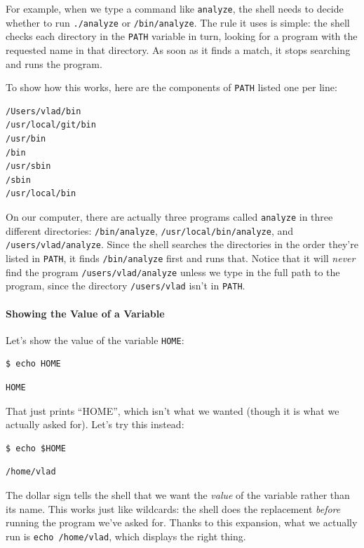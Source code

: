 \documentclass{book}
\begin{document}
For example, when we type a command like \texttt{analyze}, the shell
needs to decide whether to run \texttt{./analyze} or
\texttt{/bin/analyze}. The rule it uses is simple: the shell checks each
directory in the \texttt{PATH} variable in turn, looking for a program
with the requested name in that directory. As soon as it finds a match,
it stops searching and runs the program.

To show how this works, here are the components of \texttt{PATH} listed
one per line:

\begin{verbatim}
/Users/vlad/bin
/usr/local/git/bin
/usr/bin
/bin
/usr/sbin
/sbin
/usr/local/bin
\end{verbatim}

On our computer, there are actually three programs called
\texttt{analyze} in three different directories: \texttt{/bin/analyze},
\texttt{/usr/local/bin/analyze}, and \texttt{/users/vlad/analyze}. Since
the shell searches the directories in the order they're listed in
\texttt{PATH}, it finds \texttt{/bin/analyze} first and runs that.
Notice that it will \emph{never} find the program
\texttt{/users/vlad/analyze} unless we type in the full path to the
program, since the directory \texttt{/users/vlad} isn't in
\texttt{PATH}.

\mbox{}\paragraph{Showing the Value of a Variable}

Let's show the value of the variable \texttt{HOME}:

\begin{verbatim}
$ echo HOME
\end{verbatim}

\begin{verbatim}
HOME
\end{verbatim}

That just prints ``HOME'', which isn't what we wanted (though it is what
we actually asked for). Let's try this instead:

\begin{verbatim}
$ echo $HOME
\end{verbatim}

\begin{verbatim}
/home/vlad
\end{verbatim}

The dollar sign tells the shell that we want the \emph{value} of the
variable rather than its name. This works just like wildcards: the shell
does the replacement \emph{before} running the program we've asked for.
Thanks to this expansion, what we actually run is
\texttt{echo /home/vlad}, which displays the right thing.
\end{document}
